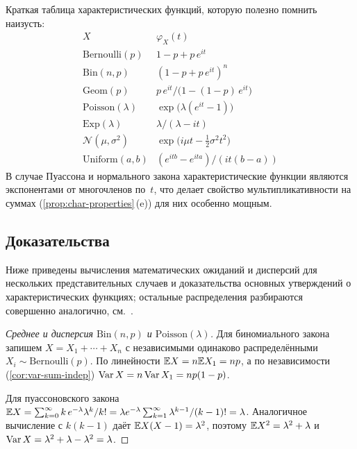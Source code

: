 \begin{remark}
Краткая таблица характеристических функций, которую полезно помнить наизусть:
\[
  \begin{array}{l|l}
    X & \varphi_X(t) \\ \hline
    \mathrm{Bernoulli}(p)        & 1 - p + p\, e^{it} \\
    \mathrm{Bin}(n, p)           & (1 - p + p\, e^{it})^n \\
    \mathrm{Geom}(p)             & p\, e^{it} / \bigl(1 - (1 - p)\, e^{it}\bigr) \\
    \mathrm{Poisson}(\lambda)    & \exp\!\bigl(\lambda(e^{it} - 1)\bigr) \\
    \mathrm{Exp}(\lambda)        & \lambda / (\lambda - it) \\
    \mathcal{N}(\mu, \sigma^2)   & \exp\!\bigl(i \mu t - \tfrac{1}{2} \sigma^2 t^2\bigr) \\
    \mathrm{Uniform}(a, b)       & (e^{itb} - e^{ita}) / (it(b - a))
  \end{array}
\]
В случае Пуассона и нормального закона характеристические функции являются экспонентами от многочленов по~$t$, что делает свойство мультипликативности на суммах (\cref{prop:char-properties}\,(e)) для них особенно мощным.
\end{remark}

\subsection*{Доказательства}

Ниже приведены вычисления математических ожиданий и дисперсий для нескольких представительных случаев и доказательства основных утверждений о характеристических функциях; остальные распределения разбираются совершенно аналогично, см.~\cite[гл.~II, \S\S~3-4]{Shiryaev1989}.

\begin{proof}[Среднее и дисперсия $\mathrm{Bin}(n, p)$ и $\mathrm{Poisson}(\lambda)$]
Для биномиального закона запишем $X = X_1 + \cdots + X_n$ с независимыми одинаково распределёнными $X_i \sim \mathrm{Bernoulli}(p)$. По линейности $\mathbb{E} X = n \mathbb{E} X_1 = np$, а по независимости (\cref{cor:var-sum-indep}) $\operatorname{Var} X = n \operatorname{Var} X_1 = n p (1 - p)$.

Для пуассоновского закона $\mathbb{E} X = \sum_{k = 0}^{\infty} k\, e^{-\lambda} \lambda^k / k! = \lambda e^{-\lambda} \sum_{k = 1}^{\infty} \lambda^{k-1}/(k-1)! = \lambda$. Аналогичное вычисление с $k(k - 1)$ даёт $\mathbb{E} X(X-1) = \lambda^2$, поэтому $\mathbb{E} X^2 = \lambda^2 + \lambda$ и $\operatorname{Var} X = \lambda^2 + \lambda - \lambda^2 = \lambda$.
\end{proof}

